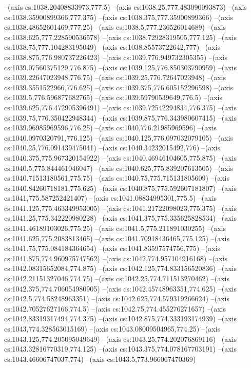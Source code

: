 --(axis cs:1038.20408833973,777.5)
--(axis cs:1038.25,777.483090093873)
--(axis cs:1038.35900899366,777.375)
--(axis cs:1038.375,777.35900899366)
--(axis cs:1038.48652601469,777.25)
--(axis cs:1038.5,777.236526014689)
--(axis cs:1038.625,777.228590536578)
--(axis cs:1038.72928319505,777.125)
--(axis cs:1038.75,777.104283195049)
--(axis cs:1038.85573722642,777)
--(axis cs:1038.875,776.980737226423)
--(axis cs:1039,776.949732305355)
--(axis cs:1039.07560375129,776.875)
--(axis cs:1039.125,776.850303790959)
--(axis cs:1039.22647023948,776.75)
--(axis cs:1039.25,776.72647023948)
--(axis cs:1039.3551522966,776.625)
--(axis cs:1039.375,776.605152296598)
--(axis cs:1039.5,776.596877682765)
--(axis cs:1039.59790539649,776.5)
--(axis cs:1039.625,776.472905396491)
--(axis cs:1039.72542294834,776.375)
--(axis cs:1039.75,776.350422948344)
--(axis cs:1039.875,776.343980607415)
--(axis cs:1039.96985969596,776.25)
--(axis cs:1040,776.21985969596)
--(axis cs:1040.0970320791,776.125)
--(axis cs:1040.125,776.097032079105)
--(axis cs:1040.25,776.091439475041)
--(axis cs:1040.34232015492,776)
--(axis cs:1040.375,775.967320154922)
--(axis cs:1040.46946104605,775.875)
--(axis cs:1040.5,775.844461046047)
--(axis cs:1040.625,775.839207613505)
--(axis cs:1040.71513180561,775.75)
--(axis cs:1040.75,775.715131805609)
--(axis cs:1040.84260718181,775.625)
--(axis cs:1040.875,775.592607181807)
--(axis cs:1041,775.587252421407)
--(axis cs:1041.08834995301,775.5)
--(axis cs:1041.125,775.463349953005)
--(axis cs:1041.21722098023,775.375)
--(axis cs:1041.25,775.342220980228)
--(axis cs:1041.375,775.335625828534)
--(axis cs:1041.46189103026,775.25)
--(axis cs:1041.5,775.211891030255)
--(axis cs:1041.625,775.2083813465)
--(axis cs:1041.70918436465,775.125)
--(axis cs:1041.75,775.084184364654)
--(axis cs:1041.83597574756,775)
--(axis cs:1041.875,774.960975747562)
--(axis cs:1042,774.957104916168)
--(axis cs:1042.08315652084,774.875)
--(axis cs:1042.125,774.833156520836)
--(axis cs:1042.21151327046,774.75)
--(axis cs:1042.25,774.711513270462)
--(axis cs:1042.375,774.706054980905)
--(axis cs:1042.45748963351,774.625)
--(axis cs:1042.5,774.58248963351)
--(axis cs:1042.625,774.579319266624)
--(axis cs:1042.70527627166,774.5)
--(axis cs:1042.75,774.455276271657)
--(axis cs:1042.83319317494,774.375)
--(axis cs:1042.875,774.333193174939)
--(axis cs:1043,774.328563015169)
--(axis cs:1043.08009504965,774.25)
--(axis cs:1043.125,774.205095049649)
--(axis cs:1043.25,774.202076869116)
--(axis cs:1043.32816770319,774.125)
--(axis cs:1043.375,774.078167703191)
--(axis cs:1043.46606747037,774)
--(axis cs:1043.5,773.966067470369)
